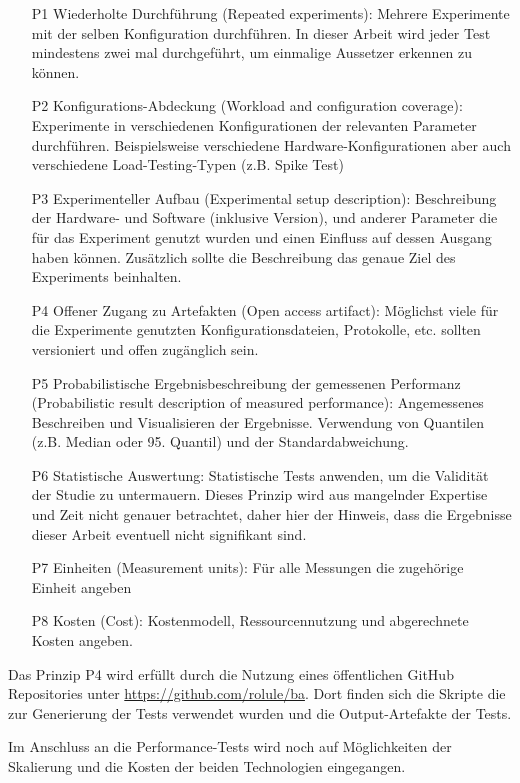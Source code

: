 \begin{enumerate}
    \item[P1] Wiederholte Durchführung (Repeated experiments): Mehrere Experimente mit der selben Konfiguration durchführen. In dieser Arbeit wird jeder Test mindestens zwei mal durchgeführt, um einmalige Aussetzer erkennen zu können.
    \item[P2] Konfigurations-Abdeckung (Workload and configuration coverage): Experimente in verschiedenen Konfigurationen der relevanten Parameter durchführen. Beispielsweise verschiedene Hardware-Konfigurationen aber auch verschiedene Load-Testing-Typen (z.B. Spike Test)
    \item[P3] Experimenteller Aufbau (Experimental setup description): Beschreibung der Hardware- und Software (inklusive Version), und anderer Parameter die für das Experiment genutzt wurden und einen Einfluss auf dessen Ausgang haben können. Zusätzlich sollte die Beschreibung das genaue Ziel des Experiments beinhalten.
    \item[P4] Offener Zugang zu Artefakten (Open access artifact): Möglichst viele für die Experimente genutzten Konfigurationsdateien, Protokolle, etc. sollten versioniert und offen zugänglich sein.
    \item[P5] Probabilistische Ergebnisbeschreibung der gemessenen Performanz (Probabilistic result description of measured performance): Angemessenes Beschreiben und Visualisieren der Ergebnisse. Verwendung von Quantilen (z.B. Median oder 95. Quantil) und der Standardabweichung.
    \item[P6] Statistische Auswertung: Statistische Tests anwenden, um die Validität der Studie zu untermauern. Dieses Prinzip wird aus mangelnder Expertise und Zeit nicht genauer betrachtet, daher hier der Hinweis, dass die Ergebnisse dieser Arbeit eventuell nicht signifikant sind.
    \item[P7] Einheiten (Measurement units): Für alle Messungen die zugehörige Einheit angeben
    \item[P8] Kosten (Cost): Kostenmodell, Ressourcennutzung und abgerechnete Kosten angeben.
\end{enumerate}

Das Prinzip P4 wird erfüllt durch die Nutzung eines öffentlichen GitHub Repositories unter \url{https://github.com/rolule/ba}. Dort finden sich die Skripte die zur Generierung der Tests verwendet wurden und die Output-Artefakte der Tests.

Im Anschluss an die Performance-Tests wird noch auf Möglichkeiten der Skalierung und die Kosten der beiden Technologien eingegangen.

